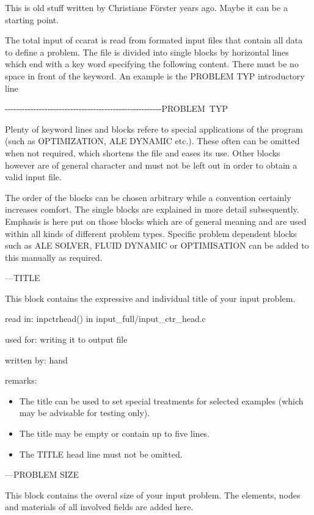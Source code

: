This is old stuff written by Christiane F\"orster years ago. Maybe it
can be a starting point.

The total input of ccarat is read from formated input files that contain
all data to define a problem. The file is divided into single blocks
by horizontal lines which end with a key word specifying the following
content. There must be no space in front of the keyword. An example
is the PROBLEM TYP introductory line 

\begin{lyxcode}
-{}-{}-{}-{}-{}-{}-{}-{}-{}-{}-{}-{}-{}-{}-{}-{}-{}-{}-{}-{}-{}-{}-{}-{}-{}-{}-{}-{}-{}-{}-{}-{}-{}-{}-{}-{}-{}-{}-{}-{}-{}-{}-{}-{}-{}-{}-{}-{}-{}-{}-{}-{}-{}-{}-PROBLEM~TYP~
\end{lyxcode}
Plenty of keyword lines and blocks refere to special applications
of the program (such as OPTIMIZATION, ALE DYNAMIC etc.). These often
can be omitted when not required, which shortens the file and eases
its use. Other blocks however are of general character and must not
be left out in order to obtain a valid input file.

The order of the blocks can be chosen arbitrary while a convention
certainly increases comfort. The single blocks are explained in more
detail subsequently. Emphasis is here put on those blocks which are
of general meaning and are used within all kinds of different problem
types. Specific problem dependent blocks such as ALE SOLVER, FLUID
DYNAMIC or OPTIMISATION can be added to this manually as required. 

---TITLE 

This block contains the expressive and individual title of your input
problem. 

read in: inpctrhead() in input\_full/input\_ctr\_head.c 

used for: writing it to output file 

written by: hand 

remarks: 

\begin{itemize}
\item The title can be used to set special treatments for selected examples
(which may be advisable for testing only). 
\item The title may be empty or contain up to five lines. 
\item The TITLE head line must not be omitted.
\end{itemize}
---PROBLEM SIZE

This block contains the overal size of your input problem. The elements,
nodes and materials of all involved fields are added here. 

